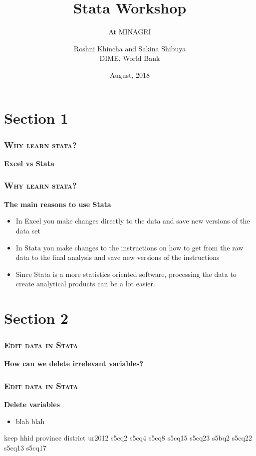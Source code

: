 \documentclass[10pt]{beamer}
\title{Stata Workshop} %
\subtitle{At MINAGRI} %
\author{Roshni Khincha and Sakina Shibuya \\ DIME, World Bank}
\date{August, 2018}
\begin{document}
	
\maketitle

\section{Section 1}

\begin{frame}
\frametitle{\textsc{Why learn stata?}}
\begin{center}
	\textbf{Excel vs Stata} \\ 
\end{center}
\end{frame}

\begin{frame}
\frametitle{\textsc{Why learn stata?}}
\begin{center}
	\Large\textbf{The main reasons to use Stata}
\end{center}
\begin{itemize}
	\item In Excel you make changes directly to the data and save new versions of the data set
	
	\item In Stata you make changes to the instructions on how to get from the raw data to the final analysis and save new versions of the instructions
	
	\item Since Stata is a more statistics oriented software, processing the data to create analytical products can be a lot easier. 
	
\end{itemize}
\end{frame}

\section{Section 2}

\begin{frame}
\frametitle{\textsc{Edit data in Stata}}
	\begin{center}
		\textbf{How can we delete irrelevant variables?}
	\end{center}
\end{frame}

\begin{frame}[fragile]
\frametitle{\textsc{Edit data in Stata}}
	\begin{center}
		\Large\textbf{Delete variables}
	\end{center}
	\begin{itemize}
		\item blah blah
	\end{itemize}
		keep hhid province district ur2012 s5cq2 s5cq4 s5cq8 s5cq15 s5cq23 s5bq2 s5cq22 s5cq13 s5cq17 
\end{frame}



	
\end{document}
